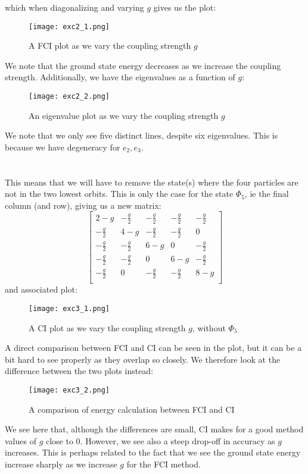 \documentclass{article}
\begin{document}
which when diagonalizing and varying $g$ gives us the plot:
\newpage
\begin{figure}[ht!]
    \centering
    \texttt{[image: exc2\_1.png]}
    \caption{A FCI plot as we vary the coupling strength $g$}
    \label{fig:enter-label}
\end{figure}
We note that the ground state energy decreases as we increase the coupling strength.
\newline
Additionally, we have the eigenvalues as a function of $g$:
\begin{figure}[ht!]
    \centering
    \texttt{[image: exc2\_2.png]}
    \caption{An eigenvalue plot as we vary the coupling strength $g$}
    \label{fig:enter-label}
\end{figure}
\newline
We note that we only see five distinct lines, despite six eigenvalues. This is because we have degeneracy for $e_2, e_3$.
\newpage
\section{}
This means that we will have to remove the state(s) where the four particles are not in the two lowest orbits. This is only the case for the state $\Phi_5$, ie the final column (and row), giving us a new matrix:
\begin{equation}
    \begin{bmatrix}
        2 - g & -\frac{g}{2} & -\frac{g}{2} & -\frac{g}{2} & -\frac{g}{2}  \\
        -\frac{g}{2} & 4 - g & -\frac{g}{2} & -\frac{g}{2} & 0  \\
        -\frac{g}{2} & -\frac{g}{2} & 6 - g & 0 & -\frac{g}{2}  \\
        -\frac{g}{2} & -\frac{g}{2} & 0 & 6 - g & -\frac{g}{2}  \\
        -\frac{g}{2} & 0 & -\frac{g}{2} & -\frac{g}{2} & 8 - g  \\
    \end{bmatrix}
\end{equation}
and associated plot:
\begin{figure}[ht!]
    \centering
    \texttt{[image: exc3\_1.png]}
    \caption{A CI plot as we vary the coupling strength $g$, without $\Phi_5$}
    \label{fig:enter-label}
\end{figure}
\newline
A direct comparison between FCI and CI can be seen in the plot, but it can be a bit hard to see properly as they overlap so closely. We therefore look at the difference between the two plots instead:
\begin{figure}[ht!]
    \centering
    \texttt{[image: exc3\_2.png]}
    \caption{A comparison of energy calculation between FCI and CI}
    \label{fig:enter-label}
\end{figure}
\newline
We see here that, although the differences are small, CI makes for a good method values of $g$ close to $0$. However, we see also a steep drop-off in accuracy as $g$ increases. This is perhaps related to the fact that we see the ground state energy increase sharply as we increase $g$ for the FCI method.
\end{document}

